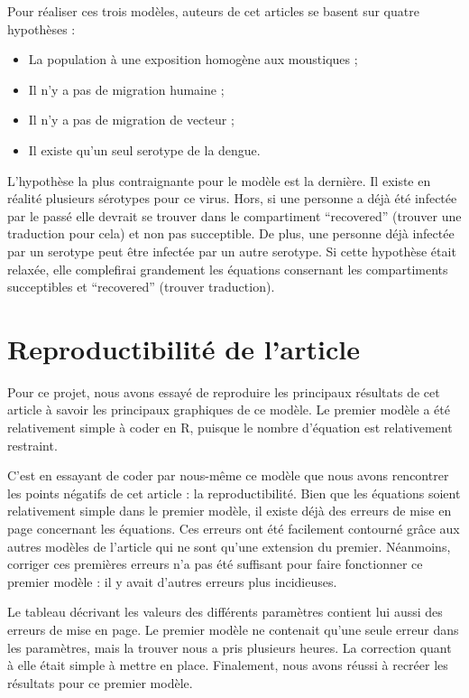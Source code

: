 \documentclass[
  12pt,
  oneside]{article}
\providecommand{\tightlist}{%
  \setlength{\itemsep}{0pt}\setlength{\parskip}{0pt}}
\begin{document}
Pour réaliser ces trois modèles, auteurs de cet articles se basent sur
quatre hypothèses :

\begin{itemize}
\tightlist
\item
  La population à une exposition homogène aux moustiques ;
\item
  Il n'y a pas de migration humaine ;
\item
  Il n'y a pas de migration de vecteur ;
\item
  Il existe qu'un seul serotype de la dengue.
\end{itemize}

L'hypothèse la plus contraignante pour le modèle est la dernière. Il
existe en réalité plusieurs sérotypes pour ce virus. Hors, si une
personne a déjà été infectée par le passé elle devrait se trouver dans
le compartiment ``recovered'' (trouver une traduction pour cela) et non
pas succeptible. De plus, une personne déjà infectée par un serotype
peut être infectée par un autre serotype. Si cette hypothèse était
relaxée, elle complefirai grandement les équations consernant les
compartiments succeptibles et ``recovered'' (trouver traduction).

\hypertarget{reproductibilituxe9-de-larticle}{%
\section{Reproductibilité de
l'article}\label{reproductibilituxe9-de-larticle}}

Pour ce projet, nous avons essayé de reproduire les principaux résultats
de cet article à savoir les principaux graphiques de ce modèle. Le
premier modèle a été relativement simple à coder en R, puisque le nombre
d'équation est relativement restraint.

C'est en essayant de coder par nous-même ce modèle que nous avons
rencontrer les points négatifs de cet article : la reproductibilité.
Bien que les équations soient relativement simple dans le premier
modèle, il existe déjà des erreurs de mise en page concernant les
équations. Ces erreurs ont été facilement contourné grâce aux autres
modèles de l'article qui ne sont qu'une extension du premier. Néanmoins,
corriger ces premières erreurs n'a pas été suffisant pour faire
fonctionner ce premier modèle : il y avait d'autres erreurs plus
incidieuses.

Le tableau décrivant les valeurs des différents paramètres contient lui
aussi des erreurs de mise en page. Le premier modèle ne contenait qu'une
seule erreur dans les paramètres, mais la trouver nous a pris plusieurs
heures. La correction quant à elle était simple à mettre en place.
Finalement, nous avons réussi à recréer les résultats pour ce premier
modèle.
\end{document}
